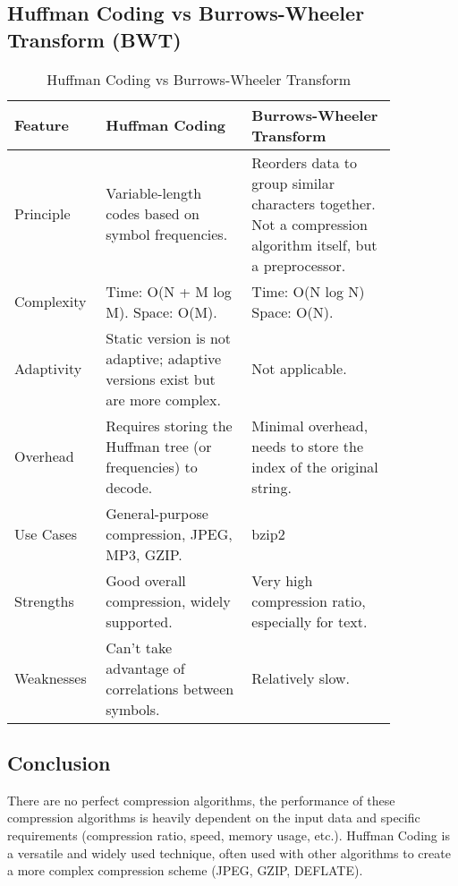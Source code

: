 \subsection{Huffman Coding vs Burrows-Wheeler Transform (BWT)}  
\begin{table}[H]  
    \centering  
    \renewcommand{\arraystretch}{1.5} %
    \setlength{\tabcolsep}{8pt} %
    \begin{tabular}{|p{0.15\linewidth}|p{0.35\linewidth}|p{0.35\linewidth}|}  
    \hline  
        \rowcolor{gray!30}  
        \textbf{Feature} & \textbf{Huffman Coding} & \textbf{Burrows-Wheeler Transform}\\\hline  
        Principle & Variable-length codes based on symbol frequencies. & Reorders data to group similar characters together. Not a compression algorithm itself, but a preprocessor.\\\hline  
        Complexity & Time: O(N + M log M). \newline Space: O(M). & Time: O(N log N) \newline Space: O(N).\\\hline  
        Adaptivity & Static version is not adaptive; adaptive versions exist but are more complex. & Not applicable. \\\hline  
        Overhead & Requires storing the Huffman tree (or frequencies) to decode. & Minimal overhead, needs to store the index of the original string.\\\hline  
        Use Cases & General-purpose compression, JPEG, MP3, GZIP. & bzip2\\\hline  
        Strengths & Good overall compression, widely supported. & Very high compression ratio, especially for text.\\\hline  
        Weaknesses & Can’t take advantage of correlations between symbols. & Relatively slow.\\\hline  
    \end{tabular}  
    \caption{Huffman Coding vs Burrows-Wheeler Transform}  
    \label{tab:Huffman_vs_BWT}  
\end{table}  
\subsection{Conclusion}
There are no perfect compression algorithms, the performance of these compression algorithms is heavily dependent on the input data and specific requirements (compression ratio, speed, memory usage, etc.). Huffman Coding is a versatile and widely used technique, often used with other algorithms to create a more complex compression scheme (JPEG, GZIP, DEFLATE).